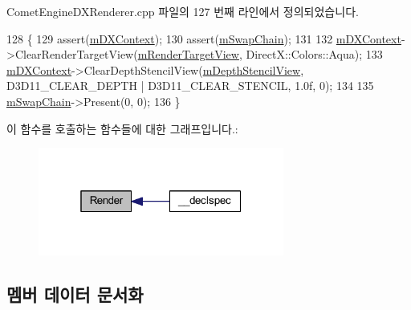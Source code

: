 Comet\+Engine\+D\+X\+Renderer.\+cpp 파일의 127 번째 라인에서 정의되었습니다.


\begin{DoxyCode}
128 \{
129     assert(\hyperlink{class_comet_engine_1_1_renderer_1_1_comet_engine_d_x_renderer_ad38b8ad7fd1c747698a96256e75eb635}{mDXContext});
130     assert(\hyperlink{class_comet_engine_1_1_renderer_1_1_comet_engine_d_x_renderer_a501ef6e0fe112727e82e727997af01c6}{mSwapChain});
131 
132     \hyperlink{class_comet_engine_1_1_renderer_1_1_comet_engine_d_x_renderer_ad38b8ad7fd1c747698a96256e75eb635}{mDXContext}->ClearRenderTargetView(\hyperlink{class_comet_engine_1_1_renderer_1_1_comet_engine_d_x_renderer_a109e138c97280440a0955d475441f49d}{mRenderTargetView}, DirectX::Colors::Aqua);
133     \hyperlink{class_comet_engine_1_1_renderer_1_1_comet_engine_d_x_renderer_ad38b8ad7fd1c747698a96256e75eb635}{mDXContext}->ClearDepthStencilView(\hyperlink{class_comet_engine_1_1_renderer_1_1_comet_engine_d_x_renderer_a01cc1c2c77d9af90d45c250d51bcfa35}{mDepthStencilView}, D3D11\_CLEAR\_DEPTH | 
      D3D11\_CLEAR\_STENCIL, 1.0f, 0);
134 
135     \hyperlink{class_comet_engine_1_1_renderer_1_1_comet_engine_d_x_renderer_a501ef6e0fe112727e82e727997af01c6}{mSwapChain}->Present(0, 0);
136 \}
\end{DoxyCode}
이 함수를 호출하는 함수들에 대한 그래프입니다.\+:\nopagebreak
\begin{figure}[H]
\begin{center}
\leavevmode
\includegraphics[width=229pt]{class_comet_engine_1_1_renderer_1_1_comet_engine_d_x_renderer_ac6fa4f62b984d0d34e785bd960255d71_icgraph}
\end{center}
\end{figure}


\subsection{멤버 데이터 문서화}
\mbox{\label{class_comet_engine_1_1_renderer_1_1_comet_engine_d_x_renderer_af2bbff1b1d0120cc652b4f2198ddb04a}} 
